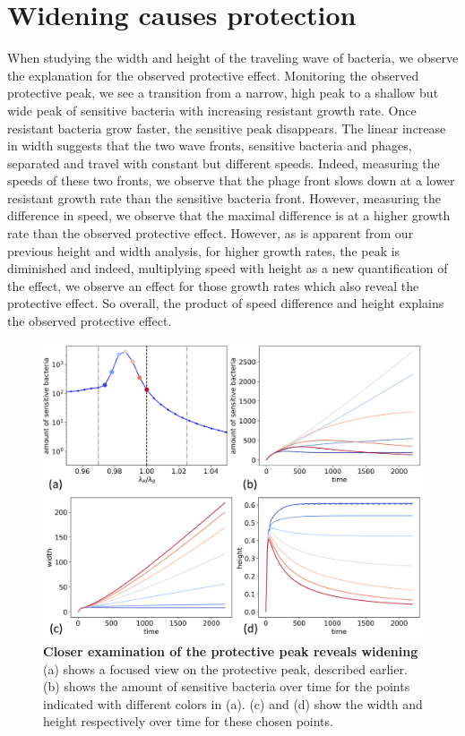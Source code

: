\section{Widening causes protection}
When studying the width and height of the traveling wave of bacteria, we observe the explanation for the observed protective effect. Monitoring the observed protective peak, we see a transition from a narrow, high peak to a shallow but wide peak of sensitive bacteria with increasing resistant growth rate. Once resistant bacteria grow faster, the sensitive peak disappears. The linear increase in width suggests that the two wave fronts, sensitive bacteria and phages, separated and travel with constant but different speeds. Indeed, measuring the speeds of these two fronts, we observe that the phage front slows down at a lower resistant growth rate than the sensitive bacteria front. However, measuring the difference in speed, we observe that the maximal difference is at a higher growth rate than the observed protective effect. However, as is apparent from our previous height and width analysis, for higher growth rates, the peak is diminished and indeed, multiplying speed with height as a new quantification of the effect, we observe an effect for those growth rates which also reveal the protective effect. So overall, the product of speed difference and height explains the observed protective effect. 

\begin{figure}
\centering
\includegraphics[width=\linewidth]{graphics/2025_09_30_phages_fig7.png}
\caption{\textbf{Closer examination of the protective peak reveals widening} (a) shows a focused view on the protective peak, described earlier. (b) shows the amount of sensitive bacteria over time for the points indicated with different colors in (a). (c) and (d) show the width and height respectively over time for these chosen points.}
\label{fig:results_peak_change_height_width}
\end{figure}


